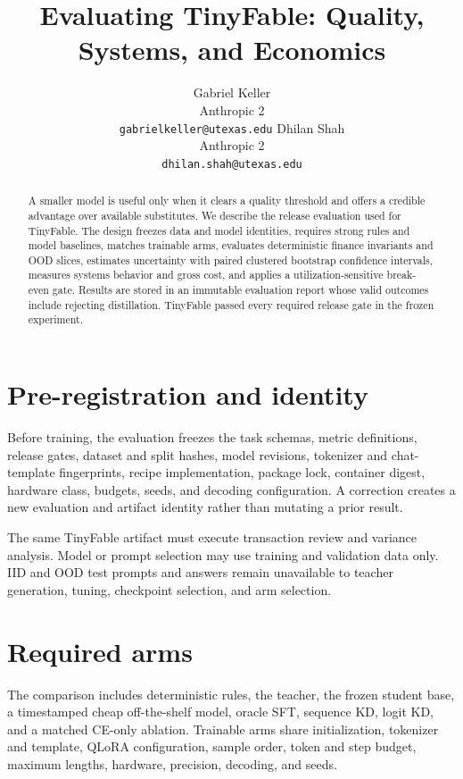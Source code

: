 \documentclass{article}
\title{Evaluating TinyFable: Quality, Systems, and Economics}
\author{
Gabriel Keller \\
Anthropic 2 \\
\texttt{gabrielkeller@utexas.edu}
\And
Dhilan Shah \\
Anthropic 2 \\
\texttt{dhilan.shah@utexas.edu}
}
\begin{document}
\maketitle

\begin{abstract}
A smaller model is useful only when it clears a quality threshold and offers a credible advantage over available substitutes. We describe the release evaluation used for TinyFable. The design freezes data and model identities, requires strong rules and model baselines, matches trainable arms, evaluates deterministic finance invariants and OOD slices, estimates uncertainty with paired clustered bootstrap confidence intervals, measures systems behavior and gross cost, and applies a utilization-sensitive break-even gate. Results are stored in an immutable evaluation report whose valid outcomes include rejecting distillation. TinyFable passed every required release gate in the frozen experiment.
\end{abstract}

\section{Pre-registration and identity}
Before training, the evaluation freezes the task schemas, metric definitions, release gates, dataset and split hashes, model revisions, tokenizer and chat-template fingerprints, recipe implementation, package lock, container digest, hardware class, budgets, seeds, and decoding configuration. A correction creates a new evaluation and artifact identity rather than mutating a prior result.

The same TinyFable artifact must execute transaction review and variance analysis. Model or prompt selection may use training and validation data only. IID and OOD test prompts and answers remain unavailable to teacher generation, tuning, checkpoint selection, and arm selection.

\section{Required arms}
The comparison includes deterministic rules, the teacher, the frozen student base, a timestamped cheap off-the-shelf model, oracle SFT, sequence KD, logit KD, and a matched CE-only ablation. Trainable arms share initialization, tokenizer and template, QLoRA configuration, sample order, token and step budget, maximum lengths, hardware, precision, decoding, and seeds.
\end{document}
